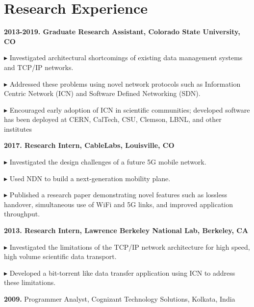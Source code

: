 \section{Research Experience}
\begin{cvlist}
\item \textbf{2013-2019. Graduate Research Assistant, Colorado State University, CO}

$\blacktriangleright$ Investigated architectural shortcomings of existing data management systems and TCP/IP networks.

$\blacktriangleright$  Addressed these problems using novel network protocols such as Information Centric Network (ICN) and Software Defined Networking (SDN).

$\blacktriangleright$ Encouraged early adoption of ICN in scientific communities; developed software has been deployed at CERN, CalTech, CSU, Clemson, LBNL, and other institutes\\

\item \textbf{2017. Research Intern, CableLabs, Louisville, CO}

$\blacktriangleright$ Investigated the design challenges of a future 5G mobile network.

$\blacktriangleright$ Used NDN to build a next-generation mobility plane.

$\blacktriangleright$ Published a research paper demonstrating novel features such as lossless handover, simultaneous use of WiFi and 5G links, and improved application throughput.\\

\item \textbf{2013. Research Intern, Lawrence Berkeley National Lab, Berkeley, CA}

$\blacktriangleright$ Investigated the limitations of the TCP/IP network architecture for high speed, high volume scientific data transport.

$\blacktriangleright$ Developed a bit-torrent like data transfer application using ICN to address these limitations.


\item \textbf{2009.} Programmer Analyst, Cognizant Technology Solutions, Kolkata, India

\end{cvlist}
